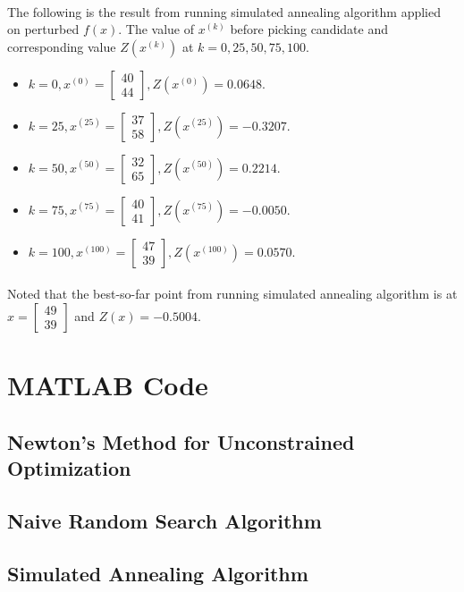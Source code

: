 \documentclass[a4paper]{article}
\begin{document}
\paragraph{}
The following is the result from running simulated annealing algorithm applied on perturbed $f(x)$. The value of $x^{(k)}$ before picking candidate and corresponding value $Z(x^{(k)})$ at $k = 0,25,50,75,100$.
\begin{itemize}
    \item $k = 0,     x^{(0)} =  \begin{bmatrix} 40 \\ 44 \end{bmatrix}, Z(x^{(0)}) = 0.0648$.
    \item $k = 25,   x^{(25)} =  \begin{bmatrix} 37 \\ 58 \end{bmatrix}, Z(x^{(25)}) = -0.3207$.
    \item $k = 50,   x^{(50)} =  \begin{bmatrix} 32 \\ 65 \end{bmatrix}, Z(x^{(50)}) = 0.2214$.
    \item $k = 75,   x^{(75)} =  \begin{bmatrix} 40 \\ 41 \end{bmatrix}, Z(x^{(75)}) = -0.0050$.
    \item $k = 100, x^{(100)} =  \begin{bmatrix} 47 \\ 39 \end{bmatrix}, Z(x^{(100)}) = 0.0570$.
\end{itemize}
\paragraph{}
Noted that the best-so-far point from running simulated annealing algorithm is at $x = \begin{bmatrix} 49 \\ 39 \end{bmatrix}$ and $Z(x) = -0.5004$.

\newpage
\section*{MATLAB Code}
\subsection*{Newton's Method for Unconstrained Optimization}

\paragraph{}
\subsection*{Naive Random Search Algorithm}

\paragraph{}
\subsection*{Simulated Annealing Algorithm}

\end{document}

